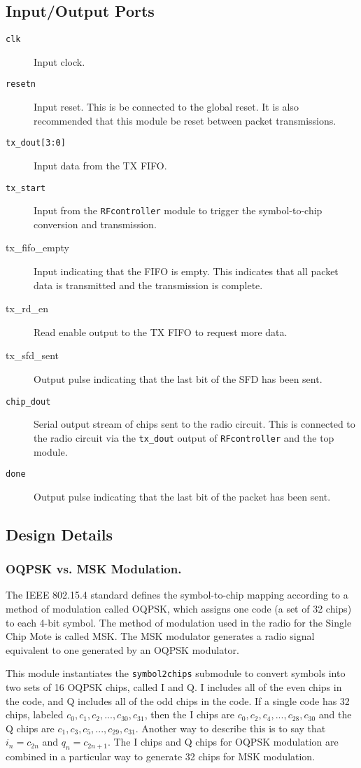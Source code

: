 \subsection{Input/Output Ports}
\begin{description}
	\item[\texttt{clk}] Input clock.
	\item[\texttt{resetn}] Input reset. This is be connected to the global reset. It is also recommended that this module be reset between packet transmissions.
	\item[\texttt{tx\_dout[3:0]}] Input data from the TX FIFO.
	\item[\texttt{tx\_start}] Input from the \texttt{RFcontroller} module to trigger the symbol-to-chip conversion and transmission.
	\item[tx\_fifo\_empty] Input indicating that the FIFO is empty. This indicates that all packet data is transmitted and the transmission is complete.
	\item[tx\_rd\_en] Read enable output to the TX FIFO to request more data.
	\item[tx\_sfd\_sent] Output pulse indicating that the last bit of the SFD has been sent.
	\item[\texttt{chip\_dout}] Serial output stream of chips sent to the radio circuit. This is connected to the radio circuit via the \texttt{tx\_dout} output of \texttt{RFcontroller} and the top module.
	\item[\texttt{done}] Output pulse indicating that the last bit of the packet has been sent.
\end{description}

\subsection{Design Details}

\subsubsection{OQPSK vs. MSK Modulation.}
The IEEE 802.15.4 standard \cite{15-4-standard} defines the symbol-to-chip mapping according to a method of modulation called OQPSK, which assigns one code (a set of 32 chips) to each 4-bit symbol. The method of modulation used in the radio for the Single Chip Mote is called MSK. The MSK modulator generates a radio signal equivalent to one generated by an OQPSK modulator. 

This module instantiates the \texttt{symbol2chips} submodule to convert symbols into two sets of 16 OQPSK chips, called I and Q. I includes all of the even chips in the code, and Q includes all of the odd chips in the code. If a single code has 32 chips, labeled $c_0,c_1,c_2,...,c_{30},c_{31}$, then the I chips are $c_0,c_2,c_4,...,c_{28},c_{30}$ and the Q chips are $c_1,c_3,c_5,...,c_{29},c_{31}$. Another way to describe this is to say that $i_n=c_{2n}$ and $q_n=c_{2n+1}$. The I chips and Q chips for OQPSK modulation are combined in a particular way to generate 32 chips for MSK modulation.

